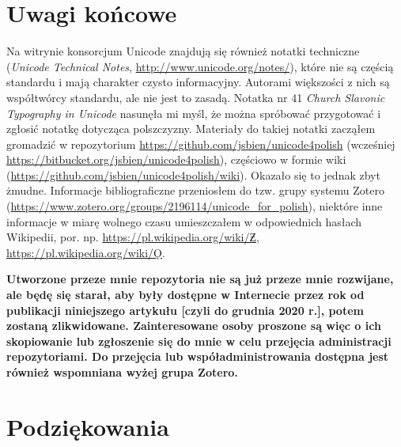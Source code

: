 



\section{Uwagi końcowe}
\label{sec:uwagi-kocowe}

Na witrynie konsorcjum Unicode znajdują się również notatki techniczne
(\textit{Unicode Technical Notes},
\url{http://www.unicode.org/notes/}), które nie są częścią standardu i
mają charakter czysto informacyjny. Autorami większości z nich są
współtwórcy standardu, ale nie jest to zasadą. Notatka nr 41
\textit{Church Slavonic Typography in Unicode} nasunęła mi myśl, że
można spróbować przygotować i zgłosić notatkę dotycząca
polszczyzny. Materiały do takiej notatki zacząłem gromadzić w
repozytorium
\url{https://github.com/jsbien/unicode4polish} (wcześniej
\url{https://bitbucket.org/jsbien/unicode4polish}),
częściowo w formie wiki
(\url{https://github.com/jsbien/unicode4polish/wiki}).
Okazało
się to jednak zbyt żmudne. Informacje bibliograficzne przeniosłem do
tzw. grupy systemu Zotero
(\url{https://www.zotero.org/groups/2196114/unicode_for_polish}),
niektóre inne informacje w miarę wolnego czasu umieszczałem w
odpowiednich hasłach Wikipedii,
por. np. \url{https://pl.wikipedia.org/wiki/Ƶ},
\url{https://pl.wikipedia.org/wiki/Ǫ}.


\textbf{Utworzone przeze mnie repozytoria nie są już przeze mnie
  rozwijane, ale będę się starał, aby były dostępne w Internecie przez
  rok od publikacji niniejszego artykułu [czyli do grudnia 2020 r.],
  potem zostaną zlikwidowane. Zainteresowane osoby proszone są więc o
  ich skopiowanie lub zgłoszenie się do mnie w celu przejęcia
  administracji repozytoriami. Do przejęcia lub współadministrowania
  dostępna jest również wspomniana wyżej grupa Zotero.}


\section{Podziękowania}
\label{sec:podzikowania}

